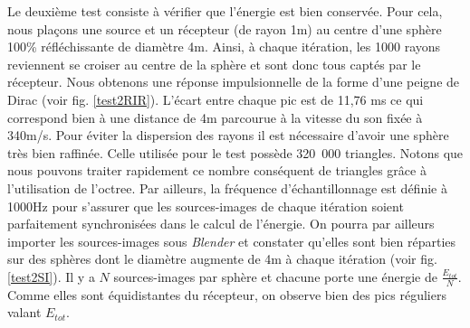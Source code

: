 Le deuxième test consiste à vérifier que l'énergie est bien conservée. Pour cela, nous plaçons une source et un récepteur (de rayon 1m) au centre d'une sphère 100\% réfléchissante de diamètre 4m. Ainsi, à chaque itération, les 1000 rayons reviennent se croiser au centre de la sphère et sont donc tous captés par le récepteur. Nous obtenons une réponse impulsionnelle de la forme d'une peigne de Dirac (voir fig. \ref{test2RIR}). L'écart entre chaque pic est de 11,76 ms ce qui correspond bien à une distance de 4m parcourue à la vitesse du son fixée à 340m/s. Pour éviter la dispersion des rayons il est nécessaire d'avoir une sphère très bien raffinée. Celle utilisée pour le test possède 320~000 triangles. Notons que nous pouvons traiter rapidement ce nombre conséquent de triangles grâce à l'utilisation de l'\gls{octree}. Par ailleurs, la fréquence d'échantillonnage est définie à 1000Hz pour s'assurer que les sources-images de chaque itération soient parfaitement synchronisées dans le calcul de l'énergie. On pourra par ailleurs importer les sources-images sous \textit{Blender} et constater qu'elles sont bien réparties sur des sphères dont le diamètre augmente de 4m à chaque itération (voir fig. \ref{test2SI}). Il y a $N$ sources-images par sphère et chacune porte une énergie de $\frac{E_{tot}}{N}$. Comme elles sont équidistantes du récepteur, on observe bien des pics réguliers valant $E_{tot}$.
